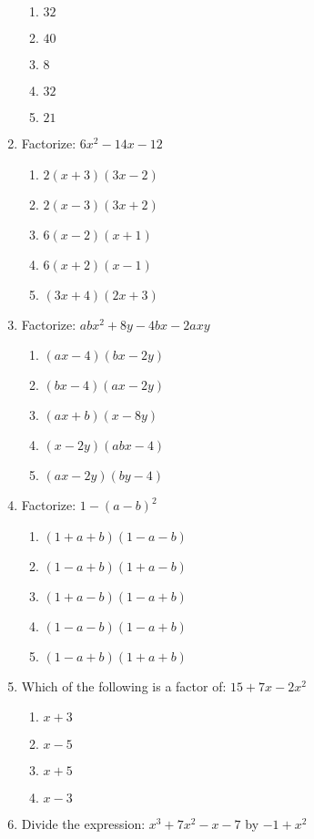 \begin{multicols}{2}
\begin{enumerate}[label={\arabic*.}]
	\begin{enumerate}[label={\Alph*.}]
	\item \(32\)
	\item \(40\)
	\item \(8\)
	\item \(32\)
	\item \(21\)
	\end{enumerate}
\item Factorize: \(6x^2 - 14x - 12\)
	\begin{enumerate}[label={\Alph*.}]
	\item \(2(x+3)(3x-2)\)
	\item \(2(x-3)(3x +2)\)
	\item \(6(x-2)(x+1)\)
	\item \(6(x+2)(x-1)\)
	\item \((3x+4)(2x+3)\)
	\end{enumerate}
\item Factorize: \(abx^2 + 8y -4bx - 2axy\)
	\begin{enumerate}[label={\Alph*.}]
	\item \((ax -4)(bx-2y)\)
	\item \((bx-4)(ax-2y)\)
	\item \((ax+b)(x-8y)\)
	\item \((x-2y)(abx-4)\)
	\item \((ax-2y)(by-4)\)
	\end{enumerate}
\item Factorize: \(1 - {(a-b)}^2\)
	\begin{enumerate}[label={\Alph*.}]
	\item \((1 +a+b)(1-a-b)\)
	\item \((1-a + b)(1+ a -b)\)
	\item \((1 + a - b)(1-a+b)\)
	\item \((1 -a -b)(1-a + b)\)
	\item \((1 -a +b)(1+a + b)\)
	\end{enumerate}
\item Which of the following is a factor of: $15 + 7x -2x^2$
	\begin{enumerate}[label={\Alph*.}]
	\item \(x +3\)
	\item \(x-5\)
	\item \(x+5\)
	\item \(x-3\)
	\end{enumerate}
\item Divide the expression: $x^3 + 7x^2 -x -7$ by $-1 + x^2$
	\begin{enumerate}[label={\Alph*.}]

\end{enumerate}
\end{enumerate}
\end{multicols}
